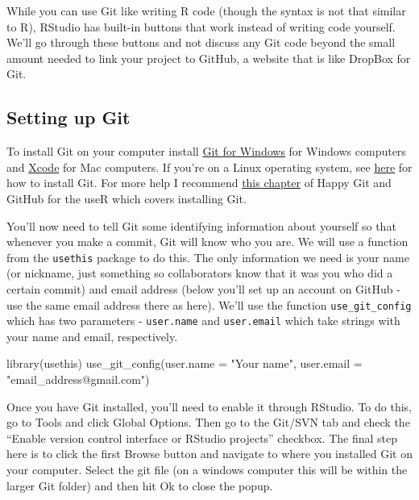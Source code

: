 \documentclass[
  12pt,
]{book}
\newenvironment{Shaded}{\begin{snugshade}}{\end{snugshade}}
\newcommand{\AttributeTok}[1]{\textcolor[rgb]{0.61,0.61,0.61}{#1}}
\newcommand{\FunctionTok}[1]{\textcolor[rgb]{0,0,0}{#1}}
\newcommand{\NormalTok}[1]{#1}
\newcommand{\StringTok}[1]{\textcolor[rgb]{0.5,0.5,0.5}{#1}}
\begin{document}
While you can use Git like writing R code (though the syntax is not that similar to R), RStudio has built-in buttons that work instead of writing code yourself. We'll go through these buttons and not discuss any Git code beyond the small amount needed to link your project to GitHub, a website that is like DropBox for Git.

\hypertarget{setting-up-git}{%
\subsection{Setting up Git}\label{setting-up-git}}

To install Git on your computer install \href{https://gitforwindows.org/}{Git for Windows} for Windows computers and \href{https://git-scm.com/download/mac}{Xcode} for Mac computers. If you're on a Linux operating system, see \href{https://git-scm.com/download/linux}{here} for how to install Git. For more help I recommend \href{https://happygitwithr.com/install-git.html}{this chapter} of Happy Git and GitHub for the useR which covers installing Git.

You'll now need to tell Git some identifying information about yourself so that whenever you make a commit, Git will know who you are. We will use a function from the \texttt{usethis} package to do this. The only information we need is your name (or nickname, just something so collaborators know that it was you who did a certain commit) and email address (below you'll set up an account on GitHub - use the same email address there as here). We'll use the function \texttt{use\_git\_config} which has two parameters - \texttt{user.name} and \texttt{user.email} which take strings with your name and email, respectively.

\begin{Shaded}
\begin{Highlighting}[]
\FunctionTok{library}\NormalTok{(usethis)}
\FunctionTok{use\_git\_config}\NormalTok{(}\AttributeTok{user.name =} \StringTok{"Your name"}\NormalTok{, }\AttributeTok{user.email =} \StringTok{"email\_address@gmail.com"}\NormalTok{)}
\end{Highlighting}
\end{Shaded}

Once you have Git installed, you'll need to enable it through RStudio. To do this, go to Tools and click Global Options. Then go to the Git/SVN tab and check the ``Enable version control interface or RStudio projects'' checkbox. The final step here is to click the first Browse button and navigate to where you installed Git on your computer. Select the git file (on a windows computer this will be within the larger Git folder) and then hit Ok to close the popup.
\end{document}
